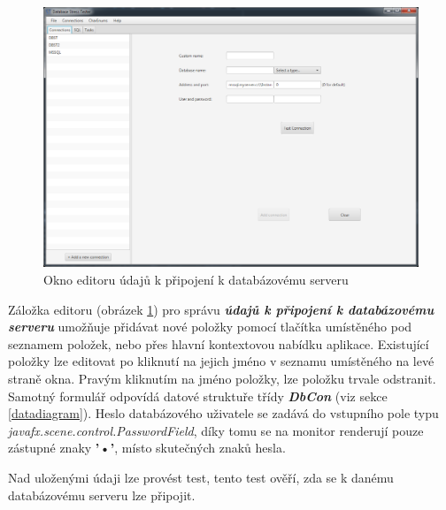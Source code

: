 \documentclass[czech,bachelor,public,dept460,male,cpdeclaration,twoside]{diploma}
\begin{document}
\begin{figure}[!htbp]\centering\includegraphics[width=1.0\textwidth]{Figures/coneditor.png}\caption{Okno editoru údajů k připojení k databázovému serveru}\label{coneditor}
\end{figure}
Záložka editoru (obrázek \ref{coneditor}) pro správu \textbf{\emph{údajů k připojení k databázovému serveru}} umožňuje přidávat nové položky pomocí tlačítka umístěného pod seznamem položek, nebo přes hlavní kontextovou nabídku aplikace. Existující položky lze editovat po kliknutí na jejich jméno v seznamu umístěného na levé straně okna. Pravým kliknutím na jméno položky, lze položku trvale odstranit. Samotný formulář odpovídá datové struktuře třídy \textbf{\emph{DbCon}} (viz sekce \ref{datadiagram}). Heslo databázového uživatele se zadává do vstupního pole typu \textit{javafx.scene.control.PasswordField}, díky tomu se na monitor renderují pouze zástupné znaky \textbf{'•'}, místo skutečných znaků hesla.

Nad uloženými údaji lze provést test, tento test ověří, zda se k danému databázovému serveru lze připojit.
\end{document}
